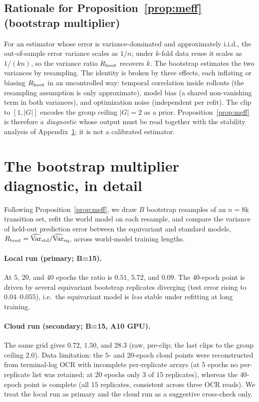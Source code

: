 \documentclass[sigconf,anonymous]{acmart}
\begin{document}
\subsection{Rationale for Proposition~\ref{prop:meff} (bootstrap multiplier)}
For an estimator whose error is variance-dominated and approximately i.i.d.,
the out-of-sample error variance scales as $1/n$; under $k$-fold data reuse
it scales as $1/(kn)$, so the variance ratio $R_{\rm boot}$ recovers $k$. The
bootstrap estimates the two variances by resampling. The identity is broken
by three effects, each inflating or biasing $R_{\rm boot}$ in an uncontrolled
way: temporal correlation inside rollouts (the resampling assumption is only
approximate), model bias (a shared non-vanishing term in both variances), and
optimization noise (independent per refit). The clip to $[1,|G|]$ encodes the
group ceiling $|G|=2$ as a prior. Proposition~\ref{prop:meff} is therefore a
\emph{diagnostic} whose output must be read together with the stability
analysis of Appendix~\ref{app:meff}; it is not a calibrated estimator.

\section{The bootstrap multiplier diagnostic, in detail}\label{app:meff}

Following Proposition~\ref{prop:meff}, we draw $B$ bootstrap resamples of an
$n=8$k transition set, refit the world model on each resample, and compare
the variance of held-out prediction error between the equivariant and
standard models, $R_{\rm boot}=\widehat{\operatorname{Var}}_{\rm std}/
\widehat{\operatorname{Var}}_{\rm eq}$, across world-model training lengths.

\paragraph{Local run (primary; B=15).}
At $5$, $20$, and $40$ epochs the ratio is $0.51$, $5.72$, and $0.09$. The
$40$-epoch point is driven by several equivariant bootstrap replicates
diverging (test error rising to $0.04$--$0.055$), i.e.\ the equivariant model
is \emph{less} stable under refitting at long training.

\paragraph{Cloud run (secondary; B=15, A10 GPU).}
The same grid gives $0.72$, $1.50$, and $28.3$ (raw, pre-clip; the last clips
to the group ceiling $2.0$). Data limitation: the $5$- and $20$-epoch cloud
points were reconstructed from terminal-log OCR with incomplete per-replicate
arrays (at $5$ epochs no per-replicate list was retained; at $20$ epochs only
$3$ of $15$ replicates), whereas the $40$-epoch point is complete (all $15$
replicates, consistent across three OCR reads). We treat the local run as
primary and the cloud run as a suggestive cross-check only.
\end{document}
